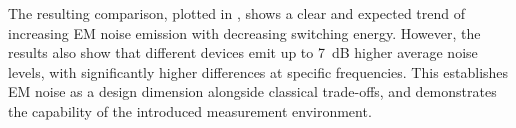 The resulting comparison, plotted in , shows a clear and expected trend of increasing EM noise emission with decreasing switching energy.
However, the results also show that different devices emit up to \SI{7}{dB} higher average noise levels, with significantly higher differences at specific frequencies.
This establishes EM noise as a design dimension alongside classical trade-offs, and demonstrates the capability of the introduced measurement environment.
